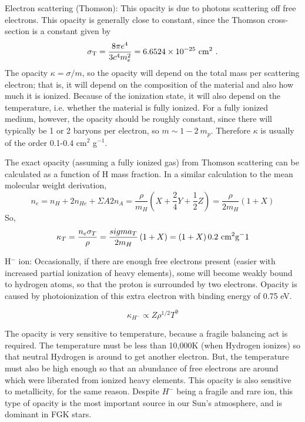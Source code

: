 \begin{enumerate}
      Electron scattering (Thomson): This opacity is due to photons scattering off free electrons. This opacity is generally close to constant, since the Thomson cross-section is a constant given by
      \begin{equation}
      \sigma_{\rm T} = \frac{8 \pi e^4}{3 c^4 m_e^2} = 6.6524\times 10^{-25}~{\rm cm}^2\,\, .
      \end{equation}
      The opacity $\kappa = \sigma / m$, so the opacity will depend on the total mass per scattering electron; that is, it will depend on the composition of the material and also how much it is ionized. Because of the ionization state, it will also depend on the temperature, i.e. whether the material is fully ionized. For a fully ionized medium, however, the opacity should be roughly constant, since there will typically be 1 or 2 baryons per electron, so $m \sim 1-2~m_p$. Therefore $\kappa$ is usually of the order 0.1-0.4 cm$^2$ g$^{-1}$.

      The exact opacity (assuming a fully ionized gas) from Thomson scattering can be calculated 
      as a function of H mass fraction.  In a similar calculation to the mean molecular weight 
      derivation, 
      \begin{equation}
      n_e=n_H+2n_{He}+\Sigma{A}{2}n_A=\frac{\rho}{m_H}\left(X+\frac{2}{4}Y+\frac{1}{2}Z\right)=\frac{\rho}{2m_H}\left(1+X\right)
      \end{equation}
      So,
      \begin{equation}
      \kappa_T=\frac{n_e\sigma_T}{\rho}=\frac{sigma_T}{2m_H}\left(1+X\right)=\left(1+X\right)0.2~{\rm cm^2 g^-1}
      \end{equation}
       
      H$^-$ ion: Occasionally, if there are enough free electrons present (easier with increased partial ionization of heavy elements), some will become weakly bound to hydrogen atoms, so that the proton is surrounded by two electrons. Opacity is caused by photoionization of this extra electron with binding energy of 0.75 eV. 
      
      \begin{equation}
      \kappa_{H^{-}} \propto Z \rho^{1/2} T^{9}
      \end{equation}
      
      The opacity is very sensitive to temperature, because a fragile balancing act is required. The temperature must be less than 10,000K (when Hydrogen ionizes) so that neutral Hydrogen is around to get another electron. But, the temperature must also be high enough so that an abundance of free electrons are around which were liberated from ionized heavy elements. This opacity is also sensitive to metallicity, for the same reason. 
      Despite $H^{-}$ being a fragile and rare ion, this type of opacity is the most important source in our Sun's atmosphere, and is dominant in FGK stars.


\end{enumerate}

